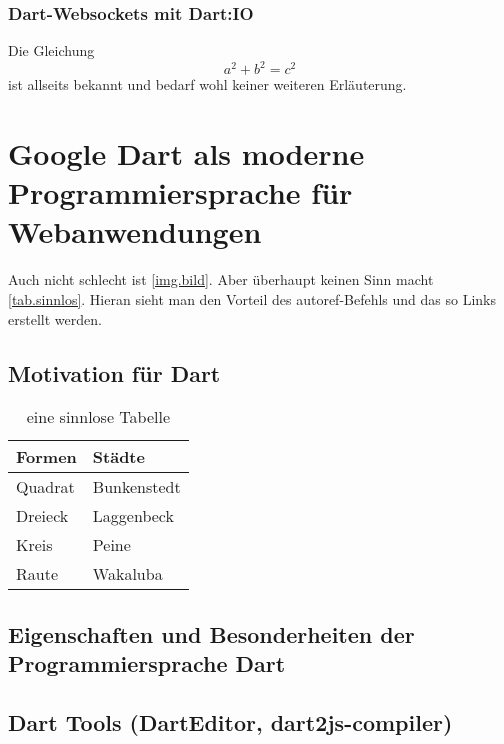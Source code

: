 \subsubsection{Dart-Websockets mit Dart:IO}
Die Gleichung
\begin{equation}
a^2 + b^2 = c^2
\end{equation}
ist allseits bekannt und bedarf wohl keiner weiteren Erläuterung.

\section{Google Dart als moderne Programmiersprache für Webanwendungen}\label{s.Google Dart als moderne Programmiersprache für Webanwendungen}

Auch nicht schlecht ist \autoref{img.bild}. Aber überhaupt keinen Sinn macht \autoref{tab.sinnlos}. Hieran sieht man den Vorteil des autoref-Befehls und das so Links erstellt werden.

\subsection{Motivation für Dart}

\begin{table}[!hbt]\vspace{1ex}\centering\begin{tabular}{|l|l|}
\hline
Formen & Städte\\
\hline
\hline
Quadrat &  Bunkenstedt \\
\hline
Dreieck &  Laggenbeck\\
\hline
Kreis &  Peine\\
\hline
Raute & Wakaluba \\
\hline
\end{tabular}
\caption{\label{tab.sinnlos}eine sinnlose Tabelle}
\vspace{2ex}\end{table}

\subsection{Eigenschaften und Besonderheiten der Programmiersprache Dart}\label{s.Eigenschaften und Besonderheiten der Programmiersprache Dart}

\subsection{Dart Tools (DartEditor, dart2js-compiler)}\label{s.Dart Tools (DartEditor, dart2js-compiler)}


